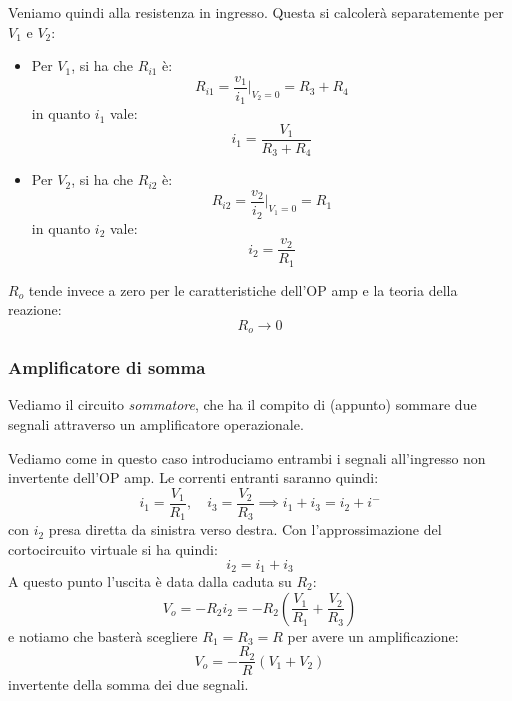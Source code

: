 \documentclass[a4paper,11pt]{article}
\begin{document}
Veniamo quindi alla resistenza in ingresso. Questa si calcolerà separatemente per $V_1$ e $V_2$:
\begin{itemize}
\item Per $V_1$, si ha che $R_{i1}$ è:
$$
R_{i1} = \frac{v_1}{i_1} \Big|_{V_2 = 0} = R_3 + R_4
$$
in quanto $i_1$ vale:
$$
i_1 = \frac{V_1}{R_3 + R_4}
$$
\item Per $V_2$, si ha che $R_{i2}$ è:
$$
R_{i2} = \frac{v_2}{i_2} \Big|_{V_1 = 0} = R_1
$$
in quanto $i_2$ vale:
$$
i_2 = \frac{v_2}{R_1}
$$
\end{itemize}

$R_o$ tende invece a zero per le caratteristiche dell'OP amp e la teoria della reazione: 
$$
R_o \rightarrow 0
$$

\subsubsection{Amplificatore di somma}
Vediamo il circuito \textit{sommatore}, che ha il compito di (appunto) sommare due segnali attraverso un amplificatore operazionale.

\begin{center}
\end{center}

Vediamo come in questo caso introduciamo entrambi i segnali all'ingresso non invertente dell'OP amp. Le correnti entranti saranno quindi:
$$
i_1 = \frac{V_1}{R_1}, \quad i_3 = \frac{V_2}{R_3} \implies i_1 + i_3 = i_2 + i^-
$$
con $i_2$ presa diretta da sinistra verso destra. Con l'approssimazione del cortocircuito virtuale si ha quindi:
$$
i_2 = i_1 + i_3
$$
A questo punto l'uscita è data dalla caduta su $R_2$:
$$
V_o = -R_2 i_2 = -R_2 \left( \frac{V_1}{R_1} + \frac{V_2}{R_3} \right)
$$
e notiamo che basterà scegliere $R_1 = R_3 = R$ per avere un amplificazione:
$$
V_o = -\frac{R_2}{R} (V_1 + V_2)
$$
invertente della somma dei due segnali.
\end{document}
